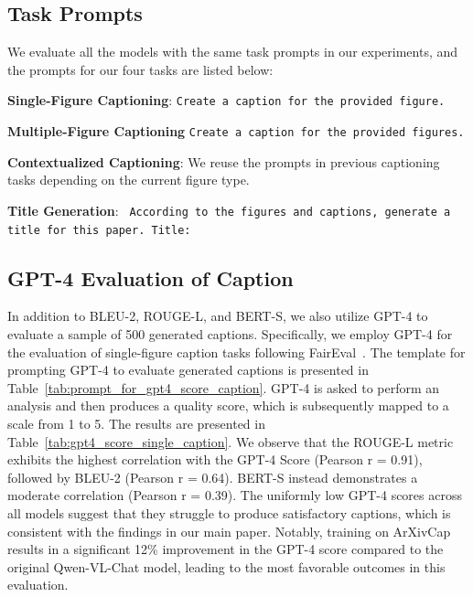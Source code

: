 \subsection{Task Prompts}
We evaluate all the models with the same task prompts in our experiments, and the prompts for our four tasks are listed below:

\noindent\textbf{Single-Figure Captioning}:  \texttt{Create a caption for the provided figure.}

\noindent\textbf{Multiple-Figure Captioning} \texttt{Create a caption for the provided figures.}

\noindent\textbf{Contextualized Captioning}: We reuse the prompts in previous captioning tasks depending on the current figure type.

\noindent\textbf{Title Generation}: \texttt{
According to the figures and captions, generate a title for this paper. Title:} 


\subsection{GPT-4 Evaluation of Caption}
\label{apx:gpt4_eval}


In addition to BLEU-2, ROUGE-L, and BERT-S, we also utilize GPT-4 to evaluate a sample of 500 generated captions. Specifically, we employ GPT-4 for the evaluation of single-figure caption tasks following FairEval~\citep{wang2023large}.
The template for prompting GPT-4 to evaluate generated captions is presented in Table~\ref{tab:prompt_for_gpt4_score_caption}. GPT-4 is asked to perform an analysis and then produces a quality score, which is subsequently mapped to a scale from 1 to 5.
The results are presented in Table~\ref{tab:gpt4_score_single_caption}. We observe that the ROUGE-L metric exhibits the highest correlation with the GPT-4 Score (Pearson r = 0.91), followed by BLEU-2 (Pearson r = 0.64). BERT-S instead demonstrates a moderate correlation (Pearson r = 0.39).
The uniformly low GPT-4 scores across all models suggest that they struggle to produce satisfactory captions, which is consistent with the findings in our main paper. Notably, training on ArXivCap results in a significant 12\% improvement in the GPT-4 score compared to the original Qwen-VL-Chat model, leading to the most favorable outcomes in this evaluation.


